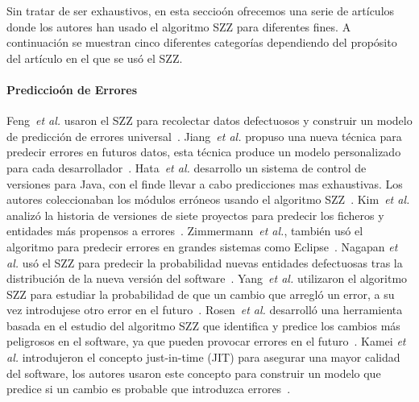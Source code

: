\documentclass[a4paper, 12pt]{book}
\begin{document}

Sin tratar de ser exhaustivos, en esta seccio\'on ofrecemos una serie de art\'iculos donde los autores han usado el algoritmo SZZ para diferentes fines. A continuaci\'on se muestran cinco diferentes categor\'ias dependiendo del prop\'osito del art\'iculo en el que se us\'o el SZZ.

\paragraph{Prediccio\'on de Errores}
Feng~\textit{et al.} usaron el SZZ para recolectar datos defectuosos y construir un modelo de predicci\'on de errores universal~\cite{zhang2014towards}. Jiang~\textit{et al.} propuso una nueva t\'ecnica para predecir errores en futuros datos, esta t\'ecnica produce un modelo personalizado para cada desarrollador~\cite{jiang2013personalized}.
Hata~\textit{et al.} desarrollo un sistema de control de versiones  para Java, con el finde llevar a cabo predicciones mas exhaustivas. Los autores coleccionaban los m\'odulos err\'oneos usando el algoritmo SZZ~\cite{hata2012bug}. Kim~\textit{et al.} analiz\'o la historia de versiones de siete proyectos para predecir los ficheros y entidades m\'as propensos a errores~\cite{kim2007predicting}. Zimmermann~\emph{et al.}, tambi\'en us\'o el algoritmo para predecir errores en grandes sistemas como Eclipse~\cite{zimmermann2007predicting}. Nagapan \emph{et al.} us\'o el SZZ para predecir la probabilidad nuevas entidades defectuosas tras la distribuci\'on de la nueva versi\'on del software~\cite{nagappan2006mining}. Yang~\textit{et al.} utilizaron el algoritmo SZZ para estudiar la probabilidad de que un cambio que arregl\'o un error, a su vez introdujese otro error en el futuro~\cite{yang2014bug}. Rosen~\textit{et al.} desarroll\'o una herramienta basada en el estudio del algoritmo SZZ que identifica y predice los cambios m\'as peligrosos en el software, ya que pueden provocar errores en el futuro~\cite{rosen2015commit}. Kamei \emph{et al.} introdujeron el concepto just-in-time (JIT) para asegurar una mayor calidad del software, los autores usaron este concepto para construir un modelo que predice si un cambio es probable que introduzca errores~\cite{kamei2013large}.
\end{document}
